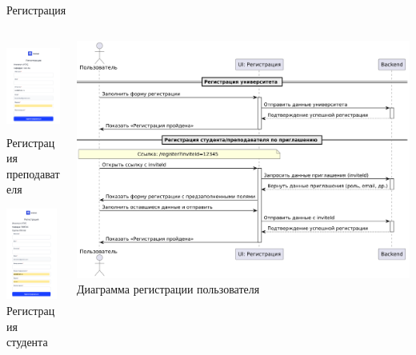 \documentclass[aspectratio=169]{beamer}
\begin{document}
\begin{frame}{Регистрация}
\begin{columns}
    \begin{column}{0.3\textwidth}
        \centering
        \includegraphics[height=3cm]{static/RegTeacherPage.png} \\
        \small Регистрация преподавателя

        \vspace{1em}

        \includegraphics[height=3cm]{static/RegStudentPage.png} \\
        \small Регистрация студента
    \end{column}
    \begin{column}{0.65\textwidth}
        \centering
        \includegraphics[width=0.95\linewidth]{static/RegistrationDiagrams.png} \\
        \small Диаграмма регистрации пользователя
    \end{column}
\end{columns}
\end{frame}
\end{document}
